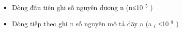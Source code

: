 \begin{itemize}
	\item     Dòng đầu tiên ghi số nguyên dương n (n≤10    $^     5    $    )   
	\item     Dòng  tiếp theo ghi n số nguyên mô tả dãy a (a    $_     i    $    ≤10    $^     9    $    )   
\end{itemize}